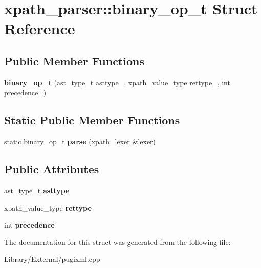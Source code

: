 \hypertarget{structxpath__parser_1_1binary__op__t}{}\section{xpath\+\_\+parser\+:\+:binary\+\_\+op\+\_\+t Struct Reference}
\label{structxpath__parser_1_1binary__op__t}
\subsection*{Public Member Functions}
\begin{DoxyCompactItemize}
\item 
\hypertarget{structxpath__parser_1_1binary__op__t_a6b8a545436af8aa0c74c91e181a2b865}{}{\bfseries binary\+\_\+op\+\_\+t} (ast\+\_\+type\+\_\+t asttype\+\_\+, xpath\+\_\+value\+\_\+type rettype\+\_\+, int precedence\+\_\+)\label{structxpath__parser_1_1binary__op__t_a6b8a545436af8aa0c74c91e181a2b865}

\end{DoxyCompactItemize}
\subsection*{Static Public Member Functions}
\begin{DoxyCompactItemize}
\item 
\hypertarget{structxpath__parser_1_1binary__op__t_a723f5f2b66df47b4ac74455cb39b9544}{}static \hyperlink{structxpath__parser_1_1binary__op__t}{binary\+\_\+op\+\_\+t} {\bfseries parse} (\hyperlink{classxpath__lexer}{xpath\+\_\+lexer} \&lexer)\label{structxpath__parser_1_1binary__op__t_a723f5f2b66df47b4ac74455cb39b9544}

\end{DoxyCompactItemize}
\subsection*{Public Attributes}
\begin{DoxyCompactItemize}
\item 
\hypertarget{structxpath__parser_1_1binary__op__t_a1af7e302de46bf45ffdb466cfd89fa15}{}ast\+\_\+type\+\_\+t {\bfseries asttype}\label{structxpath__parser_1_1binary__op__t_a1af7e302de46bf45ffdb466cfd89fa15}

\item 
\hypertarget{structxpath__parser_1_1binary__op__t_a02c18d8d6d9a7ef28b2fefcb900e75bc}{}xpath\+\_\+value\+\_\+type {\bfseries rettype}\label{structxpath__parser_1_1binary__op__t_a02c18d8d6d9a7ef28b2fefcb900e75bc}

\item 
\hypertarget{structxpath__parser_1_1binary__op__t_a422064e11cc65c6110c422568441b69c}{}int {\bfseries precedence}\label{structxpath__parser_1_1binary__op__t_a422064e11cc65c6110c422568441b69c}

\end{DoxyCompactItemize}


The documentation for this struct was generated from the following file\+:\begin{DoxyCompactItemize}
\item 
Library/\+External/pugixml.\+cpp\end{DoxyCompactItemize}
